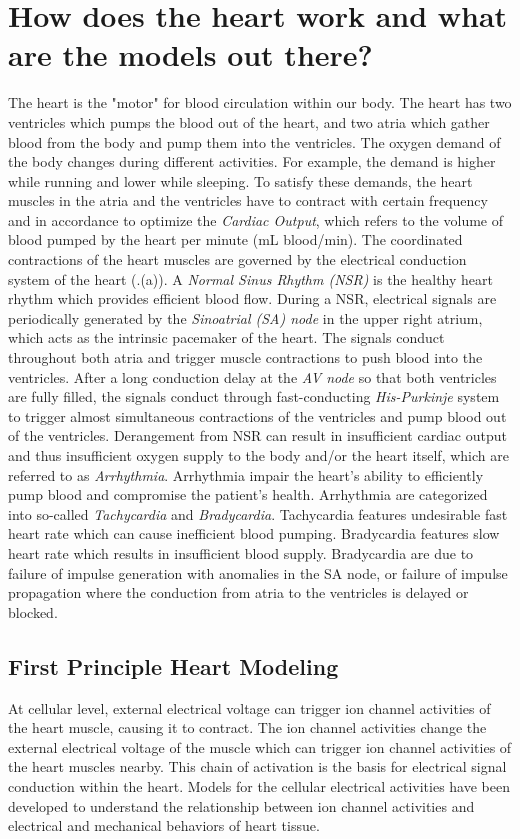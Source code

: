\section{How does the heart work and what are the models out there?}
The heart is the "motor" for blood circulation within our body. The heart has two ventricles which pumps the blood out of the heart, and two atria which gather blood from the body and pump them into the ventricles. 
The oxygen demand of the body changes during different activities. For example, the demand is higher while running and lower while sleeping. To satisfy these demands, the heart muscles in the atria and the ventricles have to contract with certain frequency and in accordance to optimize the \emph{Cardiac Output}, which refers to the volume of blood pumped by the heart per minute (mL blood/min). The coordinated contractions of the heart muscles are governed by the electrical conduction system of the heart (.(a)). 
A \emph{Normal Sinus Rhythm (NSR)} is the healthy heart rhythm which provides efficient blood flow. During a NSR, electrical signals are periodically generated by the \emph{Sinoatrial (SA) node} in the upper right atrium, which acts as the intrinsic pacemaker of the heart. The signals conduct throughout both atria and trigger muscle contractions to push blood into the ventricles. After a long conduction delay at the \emph{AV node} so that both ventricles are fully filled, the signals conduct through fast-conducting \emph{His-Purkinje} system to trigger almost simultaneous contractions of the ventricles and pump blood out of the ventricles. Derangement from NSR can result in insufficient cardiac output and thus insufficient oxygen supply to the body and/or the heart itself, which are referred to as \emph{Arrhythmia}. Arrhythmia impair the heart's ability to efficiently pump blood and compromise the patient's health. 
Arrhythmia are categorized into so-called \emph{Tachycardia} and \emph{Bradycardia}. Tachycardia features undesirable fast heart rate which can cause inefficient blood pumping. Bradycardia features slow heart rate which results in insufficient blood supply. Bradycardia are due to failure of impulse generation with anomalies in the SA node, or failure of impulse propagation where the conduction from atria to the ventricles is delayed or blocked. 
\subsection{First Principle Heart Modeling}
At cellular level, external electrical voltage can trigger ion channel activities of the heart muscle, causing it to contract. The ion channel activities change the external electrical voltage of the muscle which can trigger ion channel activities of the heart muscles nearby. This chain of activation is the basis for electrical signal conduction within the heart. Models for the cellular electrical activities have been developed to understand the relationship between ion channel activities and electrical and mechanical behaviors of heart tissue.

